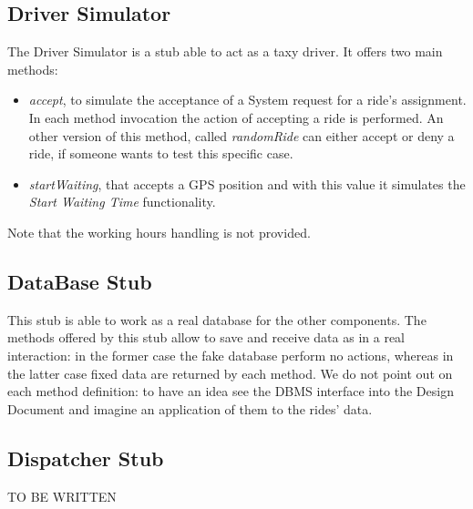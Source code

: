 \documentclass[\mainpath/main]{subfiles}
\begin{document}
\subsection{Driver Simulator}
\label{ProgramStubsAndTestDataRequired:ProgramStubs:DriverSimulator}

The Driver Simulator is a stub able to act as a taxy driver. It offers two main methods:
\begin{itemize}
	\item \textit{accept}, to simulate the acceptance of a System request for a ride's assignment. In each method invocation the action of accepting a ride is performed. An other version of this method, called \textit{randomRide} can either accept or deny a ride, if someone wants to test this specific case.
	\item \textit{startWaiting}, that accepts a GPS position and with this value it simulates the \textit{Start Waiting Time} functionality.
\end{itemize}
Note that the working hours handling is not provided.

\subsection{DataBase Stub}
\label{ProgramStubsAndTestDataRequired:ProgramStubs:DataBaseStub}

This stub is able to work as a real database for the other components. The methods offered by this stub allow to save and receive data as in a real interaction: in the former case the fake database perform no actions, whereas in the latter case fixed data are returned by each method. We do not point out on each method definition: to have an idea see the DBMS interface into the Design Document and imagine an application of them to the rides' data. 


\subsection{Dispatcher Stub}
\label{ProgramStubsAndTestDataRequired:ProgramStubs:DispatcherStub}

TO BE WRITTEN

%
%
%
\end{document}
